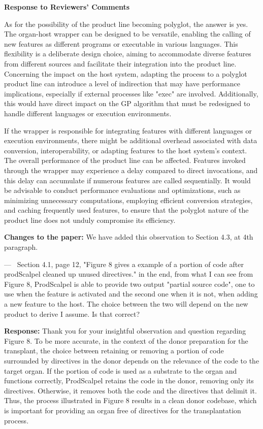 \documentclass[a4paper,11pt]{letter}
\newcounter{reviewer}
\newcounter{point}[reviewer]
\renewcommand{\thepoint}{P\,\thereviewer.\arabic{point}}
\newenvironment{point}
   {\refstepcounter{point} \bigskip \noindent {\textbf{Reviewer~Point~\thepoint} } ---\ }
   {\par }
\newcommand{\response}[1]{\textbf{Response:} \begingroup\color{black}#1\endgroup}
\newcommand{\changes}[1]{\textbf{Changes to the paper:} \begingroup\color{blue}#1\endgroup}
\begin{document}
\begin{letter}{\textbf{Response to Reviewers' Comments}}
{As for the possibility of the product line becoming polyglot, the answer is yes. 
The organ-host wrapper can be designed to be versatile, enabling the calling of new features as different programs or executable in various languages. This flexibility is a deliberate design choice, aiming to accommodate diverse features from different sources and facilitate their integration into the product line.
Concerning the impact on the host system, adapting the process to a polyglot product line can introduce a level of indirection that may have performance implications, especially if external processes like "exec" are involved. Additionally, this would have direct impact on the GP algorithm that must be redesigned to handle different languages or execution environments. 

If the wrapper is responsible for integrating features with different languages or execution environments, there might be additional overhead associated with data conversion, interoperability, or adapting features to the host system's context. The overall performance of the product line can be affected. Features invoked through the wrapper may experience a delay compared to direct invocations, and this delay can accumulate if numerous features are called sequentially. It would be advisable to conduct performance evaluations and optimizations, such as minimizing unnecessary computations, employing efficient conversion strategies, and caching frequently used features, to ensure that the polyglot nature of the product line does not unduly compromise its efficiency. 
}

\changes{We have added this observation to Section 4.3, at 4th paragraph.} 

\begin{point}
Section 4.1, page 12, "Figure 8 gives a example of a portion of code after prodScalpel cleaned up unused directives."
in the end, from what I can see from Figure 8, ProdScalpel is able to provide two output "partial source code", one to use when the feature is activated and the second one when it is not, when adding a new feature to the host. The choice between the two will depend on the new product to derive I assume. Is that correct?
	\label{pt:foo}
\end{point}

\response{Thank you for your insightful observation and question regarding Figure 8. To be more accurate, in the context of the donor preparation for the transplant, the choice between retaining or removing a portion of code surrounded by directives in the donor depends on the relevance of the code to the target organ. If the portion of code is used as a substrate to the organ and functions correctly, ProdScalpel retains the code in the donor, removing only its directives. Otherwise, it removes both the code and the directives that delimit it. Thus, the process illustrated in Figure 8 results in a clean donor codebase, which is important for providing an organ free of directives for the transplantation process.
}


\end{letter}
\end{document}
